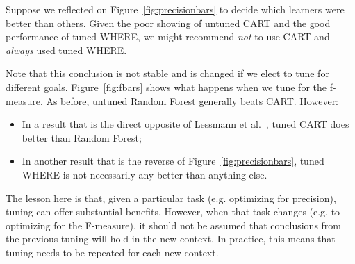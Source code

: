 \documentclass{sig-alternative}
\newcommand{\bi}{\begin{itemize}[leftmargin=0.4cm]}
\newcommand{\ei}{\end{itemize}}
\newcommand{\fig}[1]{Figure~\ref{fig:#1}}
\begin{document}
Suppose we reflected on \fig{precisionbars} to decide which learners were better than others.
Given the poor showing of untuned CART and the good performance of tuned WHERE, we might recommend
{\em not} to use CART and {\em always} used tuned WHERE.

Note that this conclusion is not stable and is changed if we elect to tune for different goals. 
\fig{fbars} shows what happens when we tune for the f-measure. 
As before, untuned Random Forest generally beats CART. However:
\bi
\item
In  a result that is the direct opposite of   
 Lessmann et al.~\cite{lessmann2008benchmarking}, tuned CART does better than Random Forest;
 \item 
 In another result that is the reverse of \fig{precisionbars}, tuned WHERE is not necessarily
 any better than anything else.
 \ei
The lesson here is that, given a particular task (e.g. optimizing for precision), tuning can offer
substantial benefits. However, when that task changes (e.g. to optimizing for the F-measure),
it should not be assumed that conclusions from the previous tuning will hold in the new context.
In practice, this means that tuning needs to be repeated for each new context.
\end{document}
